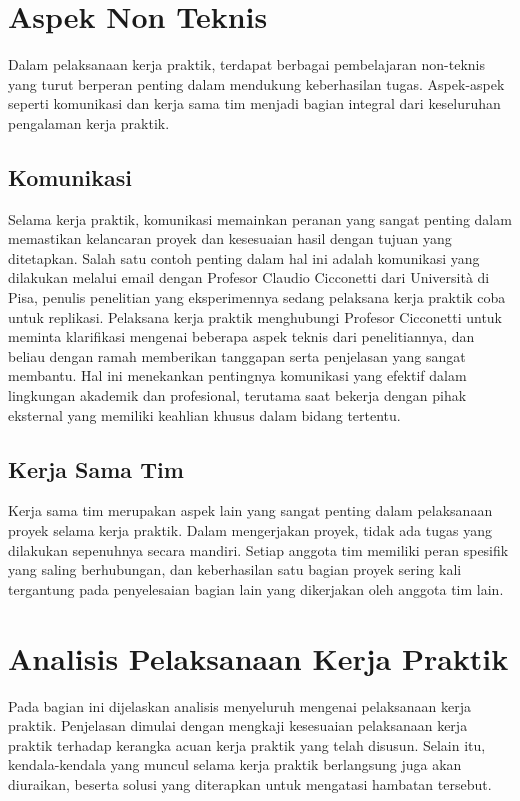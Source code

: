 \section{Aspek Non Teknis}

Dalam pelaksanaan kerja praktik, terdapat berbagai pembelajaran non-teknis yang turut berperan penting dalam mendukung keberhasilan tugas. Aspek-aspek seperti komunikasi dan kerja sama tim menjadi bagian integral dari keseluruhan pengalaman kerja praktik.

\subsection{Komunikasi}

Selama kerja praktik, komunikasi memainkan peranan yang sangat penting dalam memastikan kelancaran proyek dan kesesuaian hasil dengan tujuan yang ditetapkan. Salah satu contoh penting dalam hal ini adalah komunikasi yang dilakukan melalui email dengan Profesor Claudio Cicconetti dari Università di Pisa, penulis penelitian yang eksperimennya sedang pelaksana kerja praktik coba untuk replikasi. Pelaksana kerja praktik menghubungi Profesor Cicconetti untuk meminta klarifikasi mengenai beberapa aspek teknis dari penelitiannya, dan beliau dengan ramah memberikan tanggapan serta penjelasan yang sangat membantu. Hal ini menekankan pentingnya komunikasi yang efektif dalam lingkungan akademik dan profesional, terutama saat bekerja dengan pihak eksternal yang memiliki keahlian khusus dalam bidang tertentu.

\subsection{Kerja Sama Tim}

Kerja sama tim merupakan aspek lain yang sangat penting dalam pelaksanaan proyek selama kerja praktik. Dalam mengerjakan proyek, tidak ada tugas yang dilakukan sepenuhnya secara mandiri. Setiap anggota tim memiliki peran spesifik yang saling berhubungan, dan keberhasilan satu bagian proyek sering kali tergantung pada penyelesaian bagian lain yang dikerjakan oleh anggota tim lain.

\section{Analisis Pelaksanaan Kerja Praktik}

Pada bagian ini dijelaskan analisis menyeluruh mengenai pelaksanaan kerja praktik. Penjelasan dimulai dengan mengkaji kesesuaian pelaksanaan kerja praktik terhadap kerangka acuan kerja praktik yang telah disusun. Selain itu, kendala-kendala yang muncul selama kerja praktik berlangsung juga akan diuraikan, beserta solusi yang diterapkan untuk mengatasi hambatan tersebut.

